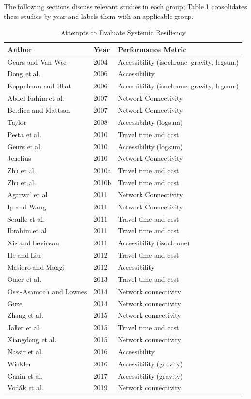 The following sections discuss relevant studies in each group; Table
\ref{tab:authortable} consolidates these studies by year and labels them
with
an applicable group.

\begin{table}

\caption{\label{tab:authortable}Attempts to Evaluate Systemic Resiliency}
\centering
\begin{tabular}[t]{lll}
\toprule
Author & Year & Performance Metric\\
\midrule
Geurs and Van Wee & 2004 & Accessibility (isochrone, gravity, logsum)\\
Dong et al. & 2006 & Accessibility\\
Koppelman and Bhat & 2006 & Accessibility (isochrone, gravity, logsum)\\
Abdel-Rahim et al. & 2007 & Network Connectivity\\
Berdica and Mattson & 2007 & Network Connectivity\\
\addlinespace
Taylor & 2008 & Accessibility (logsum)\\
Peeta et al. & 2010 & Travel time and cost\\
Geurs et al. & 2010 & Accessibility (logsum)\\
Jenelius & 2010 & Network Connectivity\\
Zhu et al. & 2010a & Travel time and cost\\
\addlinespace
Zhu et al. & 2010b & Travel time and cost\\
Agarwal et al. & 2011 & Network Connectivity\\
Ip and Wang & 2011 & Network Connectivity\\
Serulle et al. & 2011 & Travel time and cost\\
Ibrahim et al. & 2011 & Travel time and cost\\
\addlinespace
Xie and Levinson & 2011 & Accessibility (isochrone)\\
He and Liu & 2012 & Travel time and cost\\
Masiero and Maggi & 2012 & Accessibility \\
Omer et al. & 2013 & Travel time and cost\\
Osei-Asamoah and Lownes & 2014 & Network connectivity\\
\addlinespace
Guze & 2014 & Network connectivity\\
Zhang et al. & 2015 & Network connectivity\\
Jaller et al. & 2015 & Travel time and cost\\
Xiangdong et al. & 2015 & Network connectivity\\
Nassir et al. & 2016 & Accessibility \\
\addlinespace
Winkler & 2016 & Accessibility (gravity)\\
Ganin et al. & 2017 & Accessibility (gravity)\\
Vodák et al. & 2019 & Network connectivity\\
\bottomrule
\end{tabular}
\end{table}


